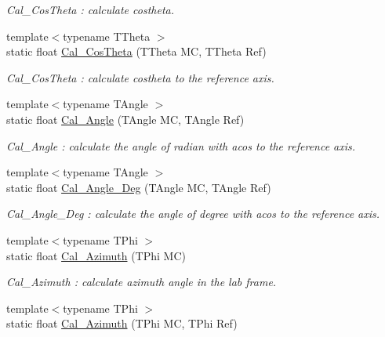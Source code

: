 \begin{DoxyCompactItemize}
\begin{DoxyCompactList}\small\item\em Cal\_\-CosTheta : calculate costheta. \item\end{DoxyCompactList}\item 
{\footnotesize template$<$typename TTheta $>$ }\\static float \hyperlink{classToolSet_1_1CMC_a91c74f61d1c9656e68f4b1037976a51b}{Cal\_\-CosTheta} (TTheta MC, TTheta Ref)
\begin{DoxyCompactList}\small\item\em Cal\_\-CosTheta : calculate costheta to the reference axis. \item\end{DoxyCompactList}\item 
{\footnotesize template$<$typename TAngle $>$ }\\static float \hyperlink{classToolSet_1_1CMC_a0637a061bf4ecd9084b794023cc11816}{Cal\_\-Angle} (TAngle MC, TAngle Ref)
\begin{DoxyCompactList}\small\item\em Cal\_\-Angle : calculate the angle of radian with acos to the reference axis. \item\end{DoxyCompactList}\item 
{\footnotesize template$<$typename TAngle $>$ }\\static float \hyperlink{classToolSet_1_1CMC_a58389b8e6c06afb39377d6d078e5616f}{Cal\_\-Angle\_\-Deg} (TAngle MC, TAngle Ref)
\begin{DoxyCompactList}\small\item\em Cal\_\-Angle\_\-Deg : calculate the angle of degree with acos to the reference axis. \item\end{DoxyCompactList}\item 
{\footnotesize template$<$typename TPhi $>$ }\\static float \hyperlink{classToolSet_1_1CMC_a3c8cfd47eac44d6e39a38598bb9158f1}{Cal\_\-Azimuth} (TPhi MC)
\begin{DoxyCompactList}\small\item\em Cal\_\-Azimuth : calculate azimuth angle in the lab frame. \item\end{DoxyCompactList}\item 
{\footnotesize template$<$typename TPhi $>$ }\\static float \hyperlink{classToolSet_1_1CMC_ab77fa5dd46a12ac8887776724261f72b}{Cal\_\-Azimuth} (TPhi MC, TPhi Ref)

\end{DoxyCompactItemize}
